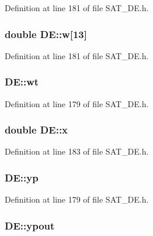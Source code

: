 Definition at line 181 of file S\-A\-T\-\_\-\-D\-E.\-h.

\hypertarget{classDE_a4cd9f3da02faec86f2926ce373a4e7c9}{
\subsubsection[{w}]{\setlength{\rightskip}{0pt plus 5cm}double D\-E\-::w\mbox{[}13\mbox{]}\hspace{0.3cm}{\ttfamily [private]}}}\label{classDE_a4cd9f3da02faec86f2926ce373a4e7c9}


Definition at line 181 of file S\-A\-T\-\_\-\-D\-E.\-h.

\hypertarget{classDE_adc470cb3c810cd47c8603003f10d4cac}{
\subsubsection[{wt}]{ D\-E\-::wt\hspace{0.3cm}{\ttfamily [private]}}}\label{classDE_adc470cb3c810cd47c8603003f10d4cac}


Definition at line 179 of file S\-A\-T\-\_\-\-D\-E.\-h.

\hypertarget{classDE_a53686f8f7ab89225ba80835e910168fa}{
\subsubsection[{x}]{\setlength{\rightskip}{0pt plus 5cm}double D\-E\-::x\hspace{0.3cm}{\ttfamily [private]}}}\label{classDE_a53686f8f7ab89225ba80835e910168fa}


Definition at line 183 of file S\-A\-T\-\_\-\-D\-E.\-h.

\hypertarget{classDE_acff3aaf84faff7827daf981587ef5b03}{
\subsubsection[{yp}]{ D\-E\-::yp\hspace{0.3cm}{\ttfamily [private]}}}\label{classDE_acff3aaf84faff7827daf981587ef5b03}


Definition at line 179 of file S\-A\-T\-\_\-\-D\-E.\-h.

\hypertarget{classDE_a985edfb71c582371040affbd4230a36a}{
\subsubsection[{ypout}]{ D\-E\-::ypout\hspace{0.3cm}{\ttfamily [private]}}}\label{classDE_a985edfb71c582371040affbd4230a36a}


